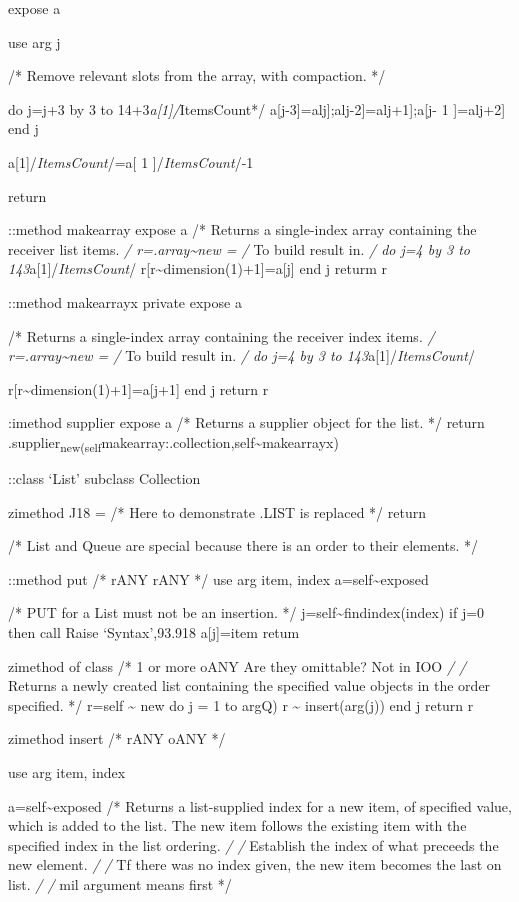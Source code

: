 expose a

use arg j

/* Remove relevant slots from the array, with compaction. */

do j=j+3 by 3 to 14+3\emph{a{[}1{]}/}ItemsCount*/
a{[}j-3{]}=alj{]};alj-2{]}=alj+1{]};a{[}j- 1 {]}=alj+2{]} end j

a{[}1{]}/\emph{ItemsCount}/=a{[} 1 {]}/\emph{ItemsCount}/-1

return

::method makearray expose a /* Returns a single-index array containing
the receiver list items. \emph{/ r=.array\textasciitilde new = /} To
build result in. \emph{/ do j=4 by 3 to 143}a{[}1{]}/\emph{ItemsCount}/
r{[}r\textasciitilde dimension(1)+1{]}=a{[}j{]} end j returm r

::method makearrayx private expose a

/* Returns a single-index array containing the receiver index items.
\emph{/ r=.array\textasciitilde new = /} To build result in. \emph{/ do
j=4 by 3 to 143}a{[}1{]}/\emph{ItemsCount}/

r{[}r\textasciitilde dimension(1)+1{]}=a{[}j+1{]} end j return r

:imethod supplier expose a /* Returns a supplier object for the list. */
return
.supplier\textsubscript{new(self}makearray:.collection,self\textasciitilde makearrayx)

::class `List' subclass Collection

zimethod J18 = /* Here to demonstrate .LIST is replaced */ return

/* List and Queue are special because there is an order to their
elements. */

::method put /* rANY rANY */ use arg item, index
a=self\textasciitilde exposed

/* PUT for a List must not be an insertion. */
j=self\textasciitilde findindex(index) if j=0 then call Raise
`Syntax',93.918 a{[}j{]}=item retum

zimethod of class /* 1 or more oANY Are they omittable? Not in IOO
\emph{/ /} Returns a newly created list containing the specified value
objects in the order specified. */ r=self \textasciitilde{} new do j = 1
to argQ) r \textasciitilde{} insert(arg(j)) end j return r

zimethod insert /* rANY oANY */

use arg item, index

a=self\textasciitilde exposed /* Returns a list-supplied index for a new
item, of specified value, which is added to the list. The new item
follows the existing item with the specified index in the list ordering.
\emph{/ /} Establish the index of what preceeds the new element. \emph{/
/} Tf there was no index given, the new item becomes the last on list.
\emph{/ /} mil argument means first */

